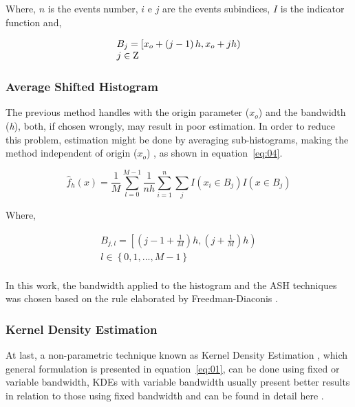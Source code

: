 \documentclass[conference]{IEEEtran}
\begin{document}
Where, $n$ is the events number, $i$ e $j$ are the events subindices, $I$ is the indicator function and,

\begin{equation}\label{eq:03}
\begin{array}{l}
{B_j} = \left[ {{x_o} + \left( {j - 1} \right)h,{x_o} + jh} \right) \\
j \in {\rm{Z}} \\
\end{array}
\end{equation}

\subsubsection{Average Shifted Histogram}

The previous method handles with the origin parameter (${x_o}$) and the bandwidth (\emph{h}), both, if chosen wrongly, may result in poor estimation. In order to reduce this problem, estimation might be done by averaging sub-histograms, making the method independent of origin (${x_o}$) \cite{seather1992performance}, as shown in equation~\ref{eq:04}.

\begin{equation}\label{eq:04}
{\hat f_h}\left( x \right) = \frac{1}{M}\sum\limits_{l = 0}^{M - 1} {\frac{1}{{nh}}\sum\limits_{i = 1}^n {\sum\limits_j {I\left( {{x_i} \in {B_j}} \right)I\left( {x \in {B_j}} \right)} } }
\end{equation}

Where,

\begin{equation}\label{eq:05}
\begin{array}{l}
{B_{j,l}} = \left[ {\left( {j - 1 + \frac{1}{M}} \right)h,\left( {j + \frac{1}{M}} \right)h} \right) \\
l \in \left\{ {0,1,...,M - 1} \right\} \\
\end{array}
\end{equation}

In this work, the bandwidth applied to the histogram and the ASH techniques was chosen based on the rule elaborated by Freedman-Diaconis \cite{freedman1981histogram}.

\subsubsection{Kernel Density Estimation}

At last, a non-parametric technique known as Kernel Density Estimation \cite{silverman1986density}, which general formulation is presented in equation~\ref{eq:01}, can be done using fixed or variable bandwidth, KDEs with variable bandwidth usually present better results in relation to those using fixed bandwidth \cite{terrell1992variable} and can be found in detail here \cite{cba2016likelihood}\cite{scott2015multivariate}.
\end{document}
